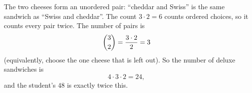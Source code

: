 The two cheeses form an unordered pair: ``cheddar and Swiss'' is the same sandwich as ``Swiss and cheddar''. The count $3\cdot2=6$ counts ordered choices, so it counts every pair twice. The number of pairs is
\[\dbinom32=\dfrac{3\cdot2}{2}=3\]
(equivalently, choose the one cheese that is left out). So the number of deluxe sandwiches is
\[4\cdot3\cdot2=\boxed{24},\]
and the student's $48$ is exactly twice this.
